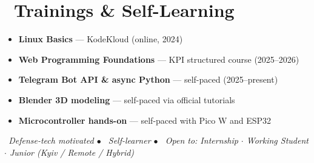 \documentclass[11pt,a4paper,sans]{moderncv}
\begin{document}
\section{\faCertificate\ Trainings \& Self-Learning}
\begin{itemize}
    \item[\faBookmark] \small \textbf{Linux Basics} — KodeKloud (online, 2024)
    \item[\faBookmark] \small \textbf{Web Programming Foundations} — KPI structured course (2025--2026)
    \item[\faBookmark] \small \textbf{Telegram Bot API \& async Python} — self-paced (2025--present)
    \item[\faBookmark] \small \textbf{Blender 3D modeling} — self-paced via official tutorials
    \item[\faBookmark] \small \textbf{Microcontroller hands-on} — self-paced with Pico W and ESP32
\end{itemize}

\vspace{0.3em}
\small\textit{\faShieldAlt\ Defense-tech motivated $\bullet$ \faSearchPlus\ Self-learner $\bullet$ \faPaperPlane\ Open to: Internship $\cdot$ Working Student $\cdot$ Junior (Kyiv / Remote / Hybrid)}
\end{document}
